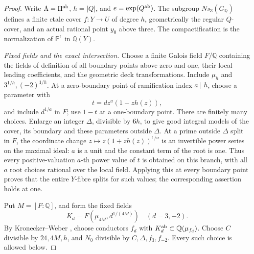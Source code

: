 \begin{proof}
Write \(\Lambda=\Pi^{\rm ab}\), \(h=|Q|\), and
\(e=\exp(Q^{\rm ab})\).
The subgroup \(Ns_3(G_{\mathbb Q})\) defines a
finite etale cover \(f:Y\to U\) of degree \(h\),
geometrically the regular \(Q\)-cover, and an
actual rational point \(y_0\) above three.
The compactification is the normalization of
\(\mathbb P^1\) in \(\mathbb Q(Y)\).

\emph{Fixed fields and the exact intersection.}
Choose a finite Galois field \(F/\mathbb Q\)
containing the fields of definition of all
boundary points above zero and one, their local
leading coefficients, and the geometric deck
transformations. Include \(\mu_h\) and
\(3^{1/h},(-2)^{1/h}\).
At a zero-boundary point of ramification index
\(a\mid h\), choose a parameter with
\[
 t=d z^a(1+zh(z)),
 \tag{FQ.3}
\]
and include \(d^{1/a}\) in \(F\); use \(1-t\)
at a one-boundary point. There are finitely many
choices. Enlarge an integer \(\Delta\), divisible
by \(6h\), to give good integral models of the
cover, its boundary and these parameters outside
\(\Delta\).
At a prime outside \(\Delta\) split in \(F\),
the coordinate change
\(z\mapsto z(1+zh(z))^{1/a}\) is an invertible
power series on the maximal ideal: \(a\) is a
unit and the constant term of the root is one.
Thus every positive-valuation \(a\)-th power
value of \(t\) is obtained on this branch, with
all \(a\) root choices rational over the local
field. Applying this at every boundary point
proves that the entire \(Y\)-fibre splits for
such values; the corresponding assertion holds
at one.

Put \(M=[F:\mathbb Q]\), and form the fixed fields
\[
 K_d=F(\mu_{4M},d^{1/(4M)})\quad(d=3,-2).
 \tag{FQ.4}
\]
By Kronecker--Weber
\cite[I, Theorem 4.16]{GhostMilneCFT}, choose
conductors \(f_d\) with
\(K_d^{\rm ab}\subset\mathbb Q(\mu_{f_d})\).
Choose \(C\) divisible by \(24,4M,h\), and
\(N_0\) divisible by \(C,\Delta,f_3,f_{-2}\).
Every such choice is allowed below.


\end{proof}
